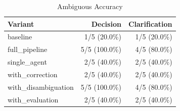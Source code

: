 \begin{table}[htbp]
\centering
\caption{Ambiguous Accuracy}
\label{tab:acc-ambig}
\begin{tabular}{l rr}
\toprule
Variant & Decision & Clarification \\
\midrule
  baseline & 1/5 (20.0\%) & 1/5 (20.0\%) \\
  full\_pipeline & 5/5 (100.0\%) & 4/5 (80.0\%) \\
  single\_agent & 2/5 (40.0\%) & 2/5 (40.0\%) \\
  with\_correction & 2/5 (40.0\%) & 2/5 (40.0\%) \\
  with\_disambiguation & 5/5 (100.0\%) & 4/5 (80.0\%) \\
  with\_evaluation & 2/5 (40.0\%) & 2/5 (40.0\%) \\
\bottomrule
\end{tabular}
\end{table}
